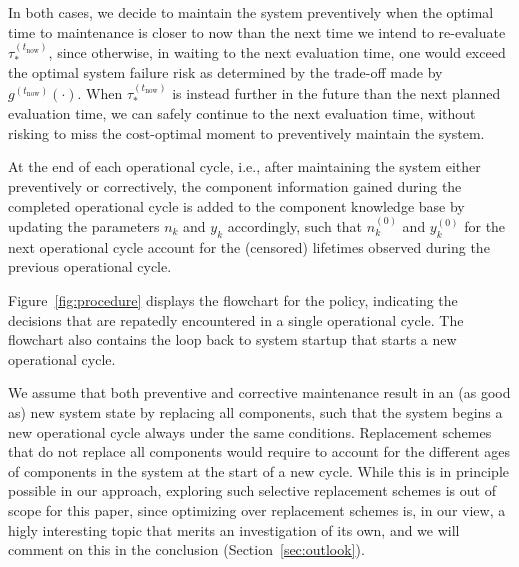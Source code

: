 \documentclass[authoryear]{elsarticle}
\newcommand{\uz}{^{(0)}} %
\def\ykz{y\uz_k}
\def\nkz{n\uz_k}
\newcommand{\nk}{n_k}
\newcommand{\yk}{y_k}
\def\tnow{t_\text{now}}
\newcommand{\gnow}{g^{(\tnow)}}
\newcommand{\tausnow}{\tau_*^{(\tnow)}}
\begin{document}
In both cases, we decide to maintain the system preventively
when the optimal time to maintenance is closer to now than the next time we intend to re-evaluate $\tausnow$,
since otherwise, in waiting to the next evaluation time,
one would exceed the optimal system failure risk 
as determined by the trade-off made by $\gnow(\cdot)$.
When $\tausnow$ is instead further in the future than the next planned evaluation time,
we can safely continue to the next evaluation time,
without risking to miss the cost-optimal moment to preventively maintain the system.

At the end of each operational cycle, i.e.,
after maintaining the system either preventively or correctively,
the component information gained during the completed operational cycle is added to the component knowledge base
by updating the parameters $\nk$ and $\yk$ accordingly,
such that $\nkz$ and $\ykz$ for the next operational cycle
account for the (censored) lifetimes observed during the previous operational cycle.

Figure~\ref{fig:procedure} displays the flowchart for the policy,
indicating the decisions that are repatedly encountered in a single operational cycle.
The flowchart also contains the loop back to system startup that starts a new operational cycle.

We assume that both preventive and corrective maintenance result in an (as good as) new system state by replacing all components,
such that the system begins a new operational cycle always under the same conditions.
Replacement schemes that do not replace all components would require to account for the different ages of components in the system
at the start of a new cycle.
While this is in principle possible in our approach,
exploring such selective replacement schemes is out of scope for this paper,
since optimizing over replacement schemes is, in our view, a higly interesting topic
that merits an investigation of its own,
and we will comment on this in the conclusion (Section~\ref{sec:outlook}).
%
\end{document}
